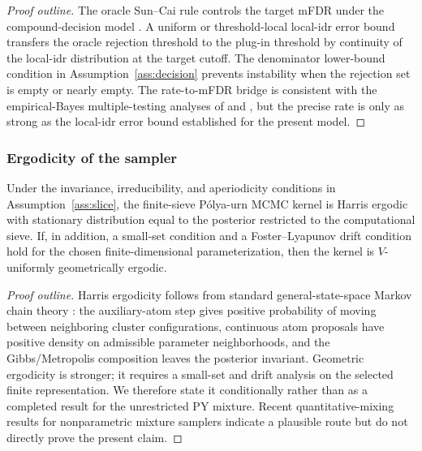 \begin{proof}[Proof outline]
The oracle Sun--Cai rule controls the target mFDR under the compound-decision model \citep{SunCai2007}. A uniform or threshold-local local-idr error bound transfers the oracle rejection threshold to the plug-in threshold by continuity of the local-idr distribution at the target cutoff. The denominator lower-bound condition in Assumption~\ref{ass:decision} prevents instability when the rejection set is empty or nearly empty. The rate-to-mFDR bridge is consistent with the empirical-Bayes multiple-testing analyses of \citet{HellerRosset2021} and \citet{CastilloRoquain2020}, but the precise rate is only as strong as the local-idr error bound established for the present model.
\end{proof}

\subsubsection{Ergodicity of the sampler}

\begin{theorem}
\label{thm:erg}
Under the invariance, irreducibility, and aperiodicity conditions in Assumption~\ref{ass:slice}, the finite-sieve P\'olya-urn MCMC kernel is Harris ergodic with stationary distribution equal to the posterior restricted to the computational sieve. If, in addition, a small-set condition and a Foster--Lyapunov drift condition hold for the chosen finite-dimensional parameterization, then the kernel is $V$-uniformly geometrically ergodic.
\end{theorem}

\begin{proof}[Proof outline]
Harris ergodicity follows from standard general-state-space Markov chain theory \citep{MeynTweedie2009,RobertsRosenthal2004}: the auxiliary-atom step gives positive probability of moving between neighboring cluster configurations, continuous atom proposals have positive density on admissible parameter neighborhoods, and the Gibbs/Metropolis composition leaves the posterior invariant. Geometric ergodicity is stronger; it requires a small-set and drift analysis on the selected finite representation. We therefore state it conditionally rather than as a completed result for the unrestricted PY mixture. Recent quantitative-mixing results for nonparametric mixture samplers \citep{Ascolani2024Mixing} indicate a plausible route but do not directly prove the present claim.
\end{proof}

